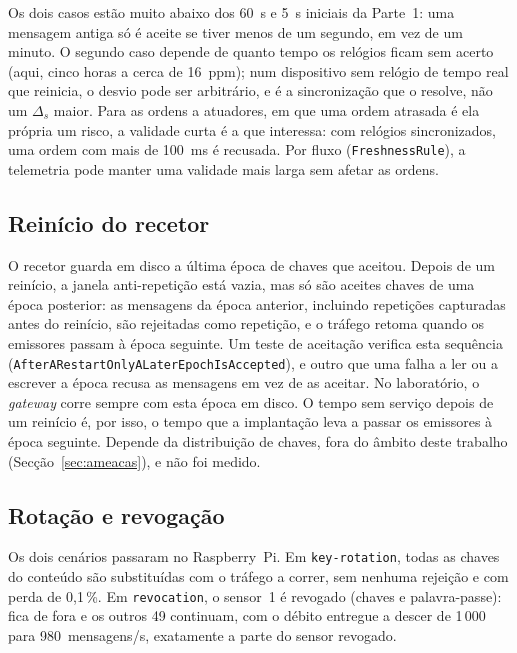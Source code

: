 Os dois casos estão muito abaixo dos 60~s e 5~s iniciais da Parte~1: uma mensagem
antiga só é aceite se tiver menos de um segundo, em vez de um minuto. O segundo
caso depende de quanto tempo os relógios ficam sem acerto (aqui, cinco horas a
cerca de 16~ppm); num dispositivo sem relógio de tempo real que reinicia, o desvio
pode ser arbitrário, e é a sincronização que o resolve, não um $\Delta_s$ maior.
Para as ordens a atuadores, em que uma ordem atrasada é ela própria um risco, a
validade curta é a que interessa: com relógios sincronizados, uma ordem com mais
de 100~ms é recusada. Por fluxo (\texttt{FreshnessRule}), a telemetria pode
manter uma validade mais larga sem afetar as ordens.

\subsection{Reinício do recetor}

O recetor guarda em disco a última época de chaves que aceitou. Depois de um
reinício, a janela anti-repetição está vazia, mas só são aceites chaves de uma
época posterior: as mensagens da época anterior, incluindo repetições capturadas
antes do reinício, são rejeitadas como repetição, e o tráfego retoma quando os
emissores passam à época seguinte. Um teste de aceitação verifica esta sequência
(\texttt{AfterARestartOnlyALaterEpochIsAccepted}), e outro que uma falha a ler ou
a escrever a época recusa as mensagens em vez de as aceitar. No laboratório, o
\emph{gateway} corre sempre com esta época em disco.
O tempo sem serviço depois de um reinício é, por isso, o tempo que a implantação
leva a passar os emissores à época seguinte. Depende da distribuição de chaves,
fora do âmbito deste trabalho (Secção~\ref{sec:ameacas}), e não foi medido.

\subsection{Rotação e revogação}

Os dois cenários passaram no Raspberry~Pi. Em \texttt{key-rotation}, todas as
chaves do conteúdo são substituídas com o tráfego a correr, sem nenhuma rejeição e
com perda de 0,1\,\%. Em \texttt{revocation}, o sensor~1 é revogado (chaves e
palavra-passe): fica de fora e os outros 49 continuam, com o débito entregue a
descer de 1\,000 para 980~mensagens/s, exatamente a parte do sensor revogado.
